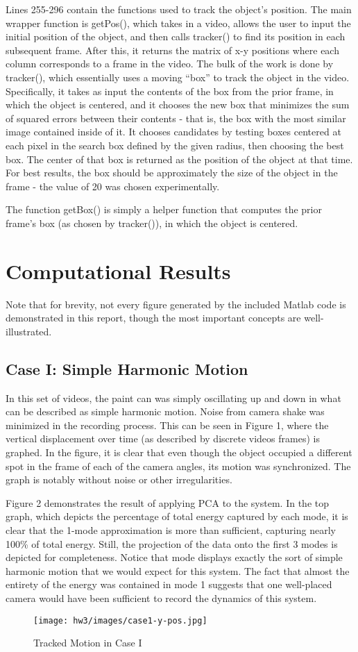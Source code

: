 \documentclass[a4paper,10 pt]{article}
\begin{document}
Lines 255-296 contain the functions used to track the object's position. The main wrapper function is getPos(), which takes in a video, allows the user to input the initial position of the object, and then calls tracker() to find its position in each subsequent frame. After this, it returns the matrix of x-y positions where each column corresponds to a frame in the video. The bulk of the work is done by tracker(), which essentially uses a moving ``box'' to track the object in the video. Specifically, it takes as input the contents of the box from the prior frame, in which the object is centered, and it chooses the new box that minimizes the sum of squared errors between their contents - that is, the box with the most similar image contained inside of it. It chooses candidates by testing boxes centered at each pixel in the search box defined by the given radius, then choosing the best box. The center of that box is returned as the position of the object at that time. For best results, the box should be approximately the size of the object in the frame - the value of 20 was chosen experimentally.

The function getBox() is simply a helper function that computes the prior frame's box (as chosen by tracker()), in which the object is centered.

\section{Computational Results}
Note that for brevity, not every figure generated by the included Matlab code is demonstrated in this report, though the most important concepts are well-illustrated.
\subsection{Case I: Simple Harmonic Motion}
In this set of videos, the paint can was simply oscillating up and down in what can be described as simple harmonic motion. Noise from camera shake was minimized in the recording process. This can be seen in Figure 1, where the vertical displacement over time (as described by discrete videos frames) is graphed. In the figure, it is clear that even though the object occupied a different spot in the frame of each of the camera angles, its motion was synchronized. The graph is notably without noise or other irregularities.

Figure 2 demonstrates the result of applying PCA to the system. In the top graph, which depicts the percentage of total energy captured by each mode, it is clear that the 1-mode approximation is more than sufficient, capturing nearly 100\% of total energy. Still, the projection of the data onto the first 3 modes is depicted for completeness. Notice that mode displays exactly the sort of simple harmonic motion that we would expect for this system. The fact that almost the entirety of the energy was contained in mode 1 suggests that one well-placed camera would have been sufficient to record the dynamics of this system.
\begin{figure}[H]
  \centering
    \texttt{[image: hw3/images/case1-y-pos.jpg]}
    \caption{Tracked Motion in Case I}
\end{figure}
\end{document}
